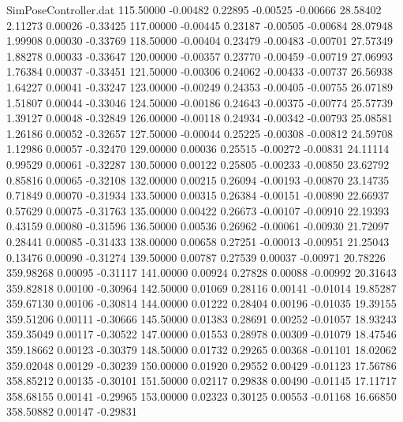 \begin{filecontents}{SimPoseController.dat}
 115.50000   -0.00482    0.22895    -0.00525   -0.00666   28.58402    2.11273    0.00026   -0.33425
 117.00000   -0.00445    0.23187    -0.00505   -0.00684   28.07948    1.99908    0.00030   -0.33769
 118.50000   -0.00404    0.23479    -0.00483   -0.00701   27.57349    1.88278    0.00033   -0.33647
 120.00000   -0.00357    0.23770    -0.00459   -0.00719   27.06993    1.76384    0.00037   -0.33451
 121.50000   -0.00306    0.24062    -0.00433   -0.00737   26.56938    1.64227    0.00041   -0.33247
 123.00000   -0.00249    0.24353    -0.00405   -0.00755   26.07189    1.51807    0.00044   -0.33046
 124.50000   -0.00186    0.24643    -0.00375   -0.00774   25.57739    1.39127    0.00048   -0.32849
 126.00000   -0.00118    0.24934    -0.00342   -0.00793   25.08581    1.26186    0.00052   -0.32657
 127.50000   -0.00044    0.25225    -0.00308   -0.00812   24.59708    1.12986    0.00057   -0.32470
 129.00000    0.00036    0.25515    -0.00272   -0.00831   24.11114    0.99529    0.00061   -0.32287
 130.50000    0.00122    0.25805    -0.00233   -0.00850   23.62792    0.85816    0.00065   -0.32108
 132.00000    0.00215    0.26094    -0.00193   -0.00870   23.14735    0.71849    0.00070   -0.31934
 133.50000    0.00315    0.26384    -0.00151   -0.00890   22.66937    0.57629    0.00075   -0.31763
 135.00000    0.00422    0.26673    -0.00107   -0.00910   22.19393    0.43159    0.00080   -0.31596
 136.50000    0.00536    0.26962    -0.00061   -0.00930   21.72097    0.28441    0.00085   -0.31433
 138.00000    0.00658    0.27251    -0.00013   -0.00951   21.25043    0.13476    0.00090   -0.31274
 139.50000    0.00787    0.27539     0.00037   -0.00971   20.78226  359.98268    0.00095   -0.31117
 141.00000    0.00924    0.27828     0.00088   -0.00992   20.31643  359.82818    0.00100   -0.30964
 142.50000    0.01069    0.28116     0.00141   -0.01014   19.85287  359.67130    0.00106   -0.30814
 144.00000    0.01222    0.28404     0.00196   -0.01035   19.39155  359.51206    0.00111   -0.30666
 145.50000    0.01383    0.28691     0.00252   -0.01057   18.93243  359.35049    0.00117   -0.30522
 147.00000    0.01553    0.28978     0.00309   -0.01079   18.47546  359.18662    0.00123   -0.30379
 148.50000    0.01732    0.29265     0.00368   -0.01101   18.02062  359.02048    0.00129   -0.30239
 150.00000    0.01920    0.29552     0.00429   -0.01123   17.56786  358.85212    0.00135   -0.30101
 151.50000    0.02117    0.29838     0.00490   -0.01145   17.11717  358.68155    0.00141   -0.29965
 153.00000    0.02323    0.30125     0.00553   -0.01168   16.66850  358.50882    0.00147   -0.29831

\end{filecontents}
